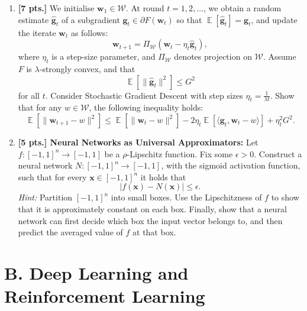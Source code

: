 \documentclass[11pt,a4paper]{article}
\DeclareMathOperator{\E}{\mathbb{E}}
\begin{document}
\begin{enumerate}[label=\textbf{\arabic*.}]
    \item \textbf{[7 pts.]} We initialise $\mathbf{w}_1 \in \mathcal{W}$. At round $t = 1, 2, \dots$, we obtain a random estimate $\hat{\mathbf{g}}_t$ of a subgradient $\mathbf{g}_t \in \partial F(\mathbf{w}_t)$ so that $\E[\hat{\mathbf{g}}_t] = \mathbf{g}_t$, and update the iterate $\mathbf{w}_t$ as follows:
    \[
    \mathbf{w}_{t+1} = \Pi_{\mathcal{W}}(\mathbf{w}_t - \eta_t \hat{\mathbf{g}}_t),
    \]
    where $\eta_t$ is a step-size parameter, and $\Pi_{\mathcal{W}}$ denotes projection on $\mathcal{W}$. Assume $F$ is $\lambda$-strongly convex, and that
    \[
    \E\left[ \|\hat{\mathbf{g}}_t\|^2 \right] \le G^2
    \]
    for all $t$. Consider Stochastic Gradient Descent with step sizes $\eta_t = \frac{1}{\lambda t}$. Show that for any $w \in \mathcal{W}$, the following inequality holds:
    \[
    \E\left[ \|\mathbf{w}_{t+1} - w\|^2 \right] \le \E\left[ \|\mathbf{w}_t - w\|^2 \right] - 2\eta_t \E\left[ \langle \mathbf{g}_t, \mathbf{w}_t - w \rangle \right] + \eta_t^2 G^2.
    \]

    \item \textbf{[5 pts.] Neural Networks as Universal Approximators:} Let $f : [-1, 1]^n \to [-1, 1]$ be a $\rho$-Lipschitz function. Fix some $\epsilon > 0$. Construct a neural network $N : [-1, 1]^n \to [-1, 1]$, with the sigmoid activation function, such that for every $\mathbf{x} \in [-1, 1]^n$ it holds that
    \[
    |f(\mathbf{x}) - N(\mathbf{x})| \le \epsilon.
    \]
    \textit{Hint:} Partition $[-1, 1]^n$ into small boxes. Use the Lipschitzness of $f$ to show that it is approximately constant on each box. Finally, show that a neural network can first decide which box the input vector belongs to, and then predict the averaged value of $f$ at that box.
\end{enumerate}

\section*{B. Deep Learning and Reinforcement Learning}
\end{document}
